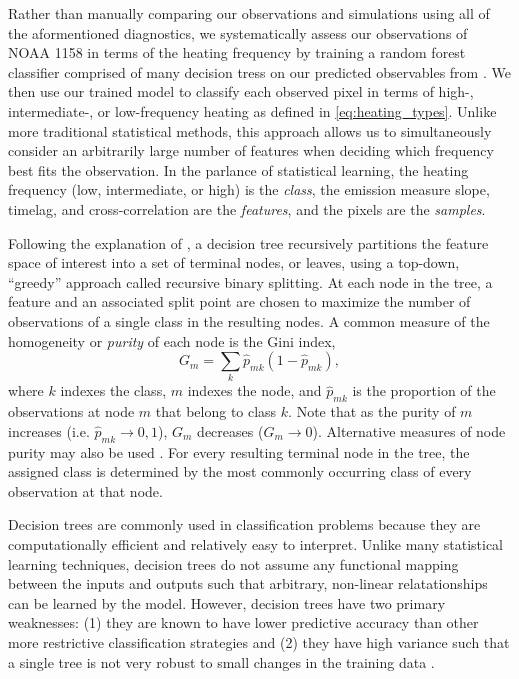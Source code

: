 Rather than manually comparing our observations and simulations using all of the aformentioned diagnostics, we systematically assess our observations of NOAA 1158 in terms of the heating frequency by training a random forest classifier comprised of many decision tress on our predicted observables from . We then use our trained model to classify each observed pixel in terms of high-, intermediate-, or low-frequency heating as defined in \autoref{eq:heating_types}. Unlike more traditional statistical methods, this approach allows us to simultaneously consider an arbitrarily large number of features when deciding which frequency best fits the observation. In the parlance of statistical learning, the heating frequency (low, intermediate, or high) is the \textit{class}, the emission measure slope, timelag, and cross-correlation are the \textit{features}, and the pixels are the \textit{samples}.

Following the explanation of \citet[chapter 8]{james_introduction_2013}, a decision tree recursively partitions the feature space of interest into a set of terminal nodes, or leaves, using a top-down, ``greedy'' approach called recursive binary splitting. At each node in the tree, a feature and an associated split point are chosen to maximize the number of observations of a single class in the resulting nodes. A common measure of the homogeneity or \textit{purity} of each node is the Gini index,
\begin{equation}\label{eq:gini-index}
    G_m = \sum_k \hat{p}_{mk} (1 - \hat{p}_{mk}),
\end{equation}
where $k$ indexes the class, $m$ indexes the node, and $\hat{p}_{mk}$ is the proportion of the observations at node $m$ that belong to class $k$. Note that as the purity of $m$ increases (i.e. $\hat{p}_{mk}\to0,1$), $G_m$ decreases ($G_m\to0$). Alternative measures of node purity may also be used \citep[see section 9.2.3 of][]{hastie_elements_2009}. For every resulting terminal node in the tree, the assigned class is determined by the most commonly occurring class of every observation at that node.

Decision trees are commonly used in classification problems because they are computationally efficient and relatively easy to interpret. Unlike many statistical learning techniques, decision trees do not assume any functional mapping between the inputs and outputs such that arbitrary, non-linear relatationships can be learned by the model. However, decision trees have two primary weaknesses: (1) they are known to have lower predictive accuracy than other more restrictive classification strategies and (2) they have high variance such that a single tree is not very robust to small changes in the training data \citep{james_introduction_2013}.

